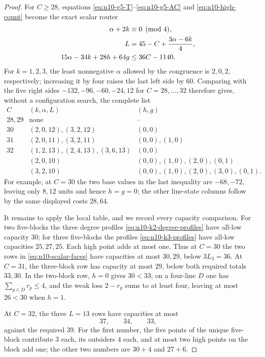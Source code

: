 \begin{proof}
For $C\ge28$, equations \eqref{eq:n10-g5-T}--\eqref{eq:n10-g5-AC} and
\eqref{eq:n10-high-count} become the exact scalar router
\begin{align}
 \alpha+2k&\equiv0\pmod4,\notag\\
 L&=45-C+\frac{3\alpha-6k}{4},\label{eq:n10-scalar-router}\\
 15\alpha-34k+28h+64g&\le36C-1140.\notag
\end{align}
For $k=1,2,3$, the least nonnegative $\alpha$ allowed by the congruence is
$2,0,2$, respectively; increasing it by four raises the last left side by
$60$.  Comparing with the five right sides
$-132,-96,-60,-24,12$ for $C=28,\ldots,32$ therefore gives, without a
configuration search, the complete list
\begin{equation}\label{eq:n10-scalar-faces}
\begin{array}{c|c|c}
C&(k,\alpha,L)&(h,g)\\ \hline
28,29&\text{none}&\text{--}\\
30&(2,0,12),(3,2,12)&(0,0)\\
31&(2,0,11),(3,2,11)&(0,0),(1,0)\\
32&(1,2,13),(2,4,13),(3,6,13)&(0,0)\\
  &(2,0,10)&(0,0),(1,0),(2,0),(0,1)\\
  &(3,2,10)&(0,0),(1,0),(2,0),(3,0),(0,1).
\end{array}
\end{equation}
For example, at $C=30$ the two base values in the last inequality are
$-68,-72$, leaving only $8,12$ units and hence $h=g=0$; the other
line-state columns follow by the same displayed costs $28,64$.

It remains to apply the local table, and we record every capacity comparison.
For two five-blocks the three degree profiles
\eqref{eq:n10-k2-degree-profiles} have all-low capacity $30$; for three
five-blocks the profiles \eqref{eq:n10-k3-profiles} have all-low capacities
$25,27,25$.  Each high point adds at most one.  Thus at $C=30$ the two
rows in \eqref{eq:n10-scalar-faces} have capacities at most $30,29$, below
$3L_3=36$.  At $C=31$, the three-block row has capacity at most $29$,
below both required totals $33,30$.  In the two-block row, $h=0$ gives
$30<33$; on a four-line $D$ one has $\sum_{p\in D}r_p\le4$, and the weak
loss $2-r_p$ sums to at least four, leaving at most $26<30$ when $h=1$.

At $C=32$, the three $L=13$ rows have capacities at most
\begin{equation}\label{eq:n10-C32-easy-capacities}
 37,\qquad34,\qquad33,
\end{equation}
against the required $39$.  For the first number, the five points of the
unique five-block contribute $3$ each, its outsiders $4$ each, and at most
two high points on the block add one; the other two numbers are
$30+4$ and $27+6$.


\end{proof}
